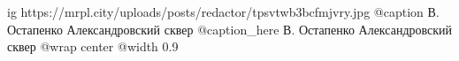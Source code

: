  
 
 
 
 

\ifcmt
  ig https://mrpl.city/uploads/posts/redactor/tpsvtwb3bcfmjvry.jpg
	@caption В. Остапенко Александровский сквер
	@caption_here В. Остапенко Александровский сквер
  @wrap center
  @width 0.9
\fi
